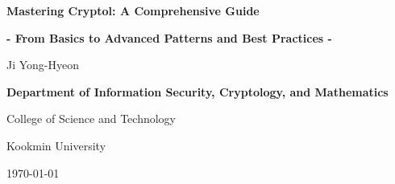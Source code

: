 \documentclass[12pt,openany]{book}
\theoremstyle{definition}
\begin{document}
	
	\begin{titlepage}
		\begin{center}
			{\Huge\textsf{\textbf{Mastering Cryptol: A Comprehensive Guide}}\par}
			{\Large\textsf{\textbf{- From Basics to Advanced Patterns and Best Practices -}}\par}
			\vspace{0.5in}
			{\Large {Ji Yong-Hyeon}\par}
			\vspace{1in}
			\vspace{1in}
			{\large\bf \textsf{Department of Information Security, Cryptology, and Mathematics}\par}
			{\textsf{College of Science and Technology}\par}
			{\textsf{Kookmin University}\par}
			\vspace{.25in}
			{\large \textsf{\today}\par}
		\end{center}
	\end{titlepage}
	
	\frontmatter
	
%	
	
	\newpage
	\tableofcontents
	
	\newpage
	\mainmatter
%	
%	
	
	\appendix
	
%	
%	
	
	\backmatter
	
\end{document}
